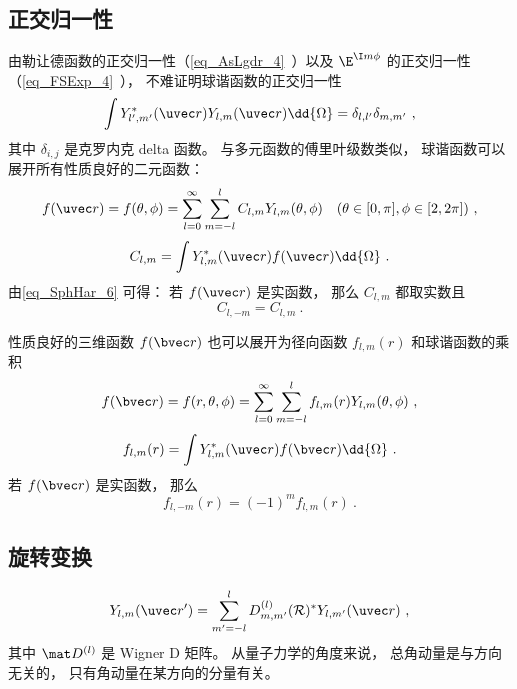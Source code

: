 \subsection{正交归一性}
由勒让德函数的正交归一性（\autoref{eq_AsLgdr_4}~）以及 $\E^{\I m \phi}$  的正交归一性（\autoref{eq_FSExp_4}~）， 不难证明球谐函数的正交归一性
\begin{equation}
\int Y_{l', m'}^*(\uvec r) Y_{l, m} (\uvec r) \dd{\Omega} = \delta_{l,l'}\delta_{m,m'}~,
\end{equation}
其中 $\delta_{i,j}$ 是克罗内克 delta 函数。 与多元函数的傅里叶级数类似， 球谐函数可以展开所有性质良好的二元函数：
\begin{equation}
f(\uvec r) = f(\theta, \phi) = \sum_{l = 0}^\infty\sum_{m=-l}^l C_{l,m}Y_{l,m}(\theta, \phi) \quad (\theta \in [0, \pi], \phi \in [2, 2\pi])~,
\end{equation}
\begin{equation}
C_{l,m} = \int Y^*_{l,m}(\uvec r) f(\uvec r) \dd{\Omega}~.
\end{equation}
由\autoref{eq_SphHar_6} 可得： 若 $f(\uvec r)$ 是实函数， 那么 $C_{l,m}$ 都取实数且
\begin{equation}\label{eq_SphHar_13}
C_{l,-m} = C_{l,m}~.
\end{equation}

性质良好的三维函数 $f(\bvec r)$ 也可以展开为径向函数 $f_{l,m}(r)$ 和球谐函数的乘积
\begin{equation}\label{eq_SphHar_9}
f(\bvec r) = f(r, \theta, \phi) = \sum_{l = 0}^\infty\sum_{m=-l}^l f_{l,m}(r) Y_{l,m}(\theta, \phi)~,
\end{equation}
\begin{equation}\label{eq_SphHar_7}
f_{l,m}(r) = \int Y^*_{l,m}(\uvec r) f(\bvec r) \dd{\Omega}~.
\end{equation}
若 $f(\bvec r)$ 是实函数， 那么
\begin{equation}
f_{l,-m}(r) = (-1)^m f_{l,m}(r)~.
\end{equation}

\subsection{旋转变换}
\begin{equation}
Y_{l,m}(\uvec r') = \sum_{m'=-l}^l D_{m,m'}^{(l)} (\mathcal R)^* Y_{l,m'}(\uvec r)~,
\end{equation}
其中 $\mat D^{(l)}$ 是 Wigner D 矩阵。 从量子力学的角度来说， 总角动量是与方向无关的， 只有角动量在某方向的分量有关。

